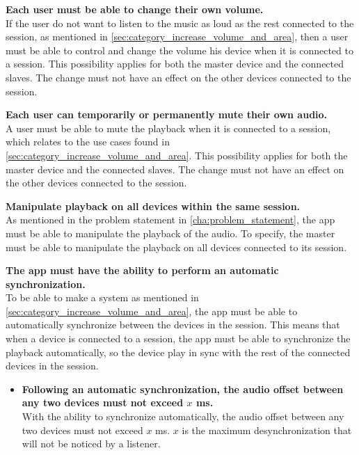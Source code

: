 \begin{eletterate}
    \item \textbf{Each user must be able to change their own volume.} \hfill\\
        If the user do not want to listen to the music as loud as the rest connected to the session, as mentioned in \cref{sec:category_increase_volume_and_area}, 
        then a user must be able to control and change the volume his device when it is connected to a session.
        This possibility applies for both the master device and the connected slaves.
        The change must not have an effect on the other devices connected to the session.

    \item \textbf{Each user can temporarily or permanently mute their own audio.} \hfill\\
        A user must be able to mute the playback when it is connected to a session, which relates to the use cases found in \cref{sec:category_increase_volume_and_area}.
        This possibility applies for both the master device and the connected slaves.
        The change must not have an effect on the other devices connected to the session.
    
    \item \textbf{Manipulate playback on all devices within the same session.} \hfill\\
        As mentioned in the problem statement in \cref{cha:problem_statement}, the app must be able to manipulate the playback of the audio. 
        To specify, the master must be able to manipulate the playback on all devices connected to its session.
    
    \item \textbf{The app must have the ability to perform an automatic synchronization.} \hfill\\
        To be able to make a system as mentioned in \cref{sec:category_increase_volume_and_area}, 
        the app must be able to automatically synchronize between the devices in the session. 
        This means that when a device is connected to a session, the app must be able to synchronize the playback automatically,
        so the device play in sync with the rest of the connected devices in the session.

    \begin{itemize}
        \item \textbf{Following an automatic synchronization, the audio offset between any two devices must not exceed $x$ ms.} \hfill\\
            With the ability to synchronize automatically, the audio offset between any two devices must not exceed $x$ ms.
            $x$ is the maximum desynchronization that will not be noticed by a listener.


\end{itemize}
\end{eletterate}
